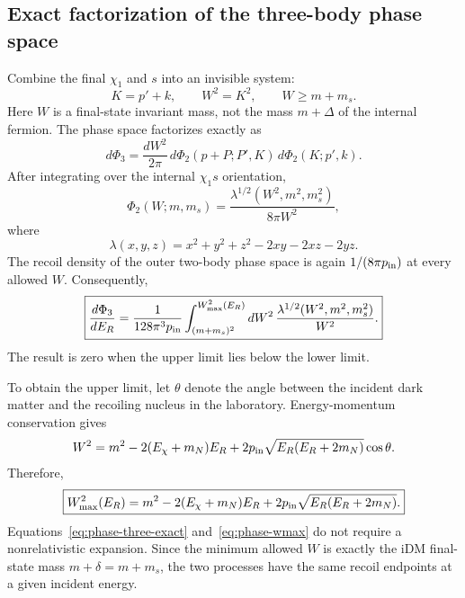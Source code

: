 \documentclass[prd,showpacs,preprintnumbers,amsmath,amssymb,twocolumn,
superscriptaddress,notitlepage]{revtex4-2}
\begin{document}
\subsection{Exact factorization of the three-body phase space}

Combine the final $\chi_1$ and $s$ into an invisible system:
\begin{equation}
K=p'+k,\qquad W^2=K^2,\qquad W\geq m+m_s.
\end{equation}
Here $W$ is a final-state invariant mass, not the mass $m+\Delta$
of the internal fermion. The phase space factorizes exactly as
\begin{equation}
\boxed{
d\Phi_3=
\frac{dW^2}{2\pi}\,
d\Phi_2(p+P;P',K)\,
d\Phi_2(K;p',k).
}
\label{eq:phase-factorization}
\end{equation}
After integrating over the internal $\chi_1s$ orientation,
\begin{equation}
\Phi_2(W;m,m_s)=
\frac{\lambda^{1/2}(W^2,m^2,m_s^2)}{8\pi W^2},
\end{equation}
where
\begin{equation}
\lambda(x,y,z)=x^2+y^2+z^2-2xy-2xz-2yz.
\end{equation}
The recoil density of the outer two-body phase space is again
$1/(8\pi p_{\rm in})$ at every allowed $W$. Consequently,
\begin{equation}
\boxed{
\frac{d\Phi_3}{dE_R}
=
\frac{1}{128\pi^3p_{\rm in}}
\int_{(m+m_s)^2}^{W_{\max}^2(E_R)}
dW^2\,
\frac{\lambda^{1/2}(W^2,m^2,m_s^2)}{W^2}.
}
\label{eq:phase-three-exact}
\end{equation}
The result is zero when the upper limit lies below the lower limit.

To obtain the upper limit, let $\theta$ denote the angle between the
incident dark matter and the recoiling nucleus in the laboratory.
Energy-momentum conservation gives
\begin{equation}
W^2=m^2-2(E_\chi+m_N)E_R
+2p_{\rm in}\sqrt{E_R(E_R+2m_N)}\cos\theta.
\end{equation}
Therefore,
\begin{equation}
\boxed{
W_{\max}^2(E_R)
=m^2-2(E_\chi+m_N)E_R
+2p_{\rm in}\sqrt{E_R(E_R+2m_N)}.
}
\label{eq:phase-wmax}
\end{equation}
Equations~\eqref{eq:phase-three-exact} and~\eqref{eq:phase-wmax}
do not require a nonrelativistic expansion.
Since the minimum allowed $W$ is exactly the iDM final-state mass
$m+\delta=m+m_s$, the two processes have the same recoil endpoints
at a given incident energy.
\end{document}

